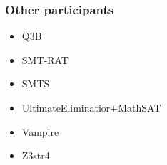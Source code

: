\documentclass[table]{beamer}
\newcommand\vitem{\vfill\item}
\begin{document}
{
\begin{frame}
  \vspace*{-1pt}%
  \noindent{}
\end{frame}
}

{
\begin{frame}
  \vspace*{-1pt}%
  \noindent{}
\end{frame}
}

{
  \begin{frame}
    \frametitle{Other participants}
    \begin{itemize}
      \item Q3B
      \vitem SMT-RAT
      \vitem SMTS
      \vitem UltimateEliminatior+MathSAT
      \vitem Vampire
      \vitem Z3str4
    \end{itemize}
  \end{frame}
}
\end{document}
